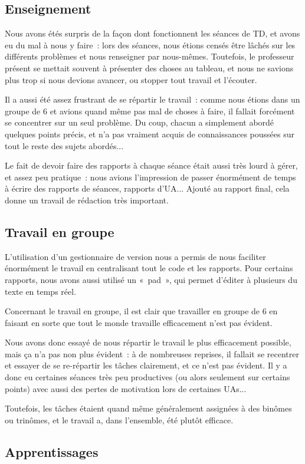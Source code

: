 
\subsection{Enseignement}

Nous avons étés surpris de la façon dont fonctionnent
les séances de TD, et avons eu du mal à nous y faire~:
lors des séances, nous étions censés être lâchés sur les
différents problèmes et nous renseigner par nous-mêmes.
Toutefois, le professeur présent se mettait souvent à présenter
des choses au tableau, et nous ne savions plus trop si nous
devions avancer, ou stopper tout travail et l'écouter.

Il a aussi été assez frustrant de se répartir le travail~:
comme nous étions dans un groupe de 6 et avions quand même
pas mal de choses à faire, il fallait forcément se concentrer
sur un seul problème. Du coup, chacun a simplement abordé
quelques points précis, et n'a pas vraiment acquis de connaissances
poussées sur tout le reste des sujets abordés...

Le fait de devoir faire des rapports à chaque séance était aussi
très lourd à gérer, et assez peu pratique~: nous avions l'impression
de passer énormément de temps à écrire des rapports de séances,
rapports d'UA... Ajouté au rapport final, cela donne un travail
de rédaction très important.

\subsection{Travail en groupe} %

L'utilisation d'un gestionnaire de version nous a permis de nous
faciliter énormément le travail en centralisant tout le code et les rapports.
Pour certains rapports, nous avons aussi utilisé un «~pad~», qui permet
d'éditer à plusieurs du texte en temps réel.

Concernant le travail en groupe, il est clair que travailler en groupe de 6
en faisant en sorte que tout le monde travaille efficacement n'est pas évident.

Nous avons donc essayé de nous répartir le travail le plus efficacement possible,
mais ça n'a pas non plus évident~: à de nombreuses reprises, il fallait se recentrer
et essayer de se re-répartir les tâches clairement, et ce n'est pas évident.
Il y a donc eu certaines séances très peu productives (ou alors seulement
sur certains points) avec aussi des pertes de motivation lors de certaines UAs...

Toutefois, les tâches étaient quand même généralement assignées à des binômes ou trinômes,
et le travail a, dans l'ensemble, été plutôt efficace.

\subsection{Apprentissages}

